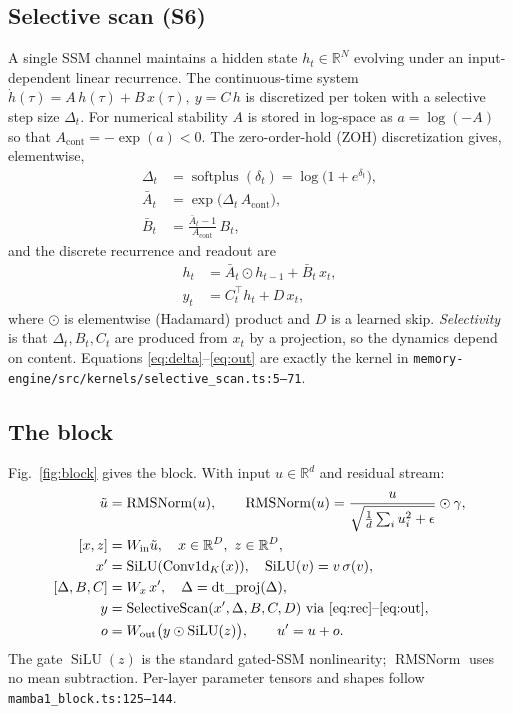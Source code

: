\documentclass[journal,onecolumn,11pt]{IEEEtran}
\DeclareMathOperator{\softplus}{softplus}
\DeclareMathOperator{\silu}{SiLU}
\DeclareMathOperator{\rmsnorm}{RMSNorm}
\newcommand{\Abar}{\bar{A}}
\newcommand{\Bbar}{\bar{B}}
\newcommand{\R}{\mathbb{R}}
\begin{document}
\subsection{Selective scan (S6)}
A single SSM channel maintains a hidden state $h_t\in\R^{N}$ evolving under an
input-dependent linear recurrence. The continuous-time system
$\dot h(\tau)=A\,h(\tau)+B\,x(\tau),\ y=C\,h$ is discretized per token with a
selective step size $\Delta_t$. For numerical stability $A$ is stored in
log-space as $a=\log(-A)$ so that $A_{\text{cont}}=-\exp(a)<0$. The zero-order-hold
(ZOH) discretization gives, elementwise,
\begin{align}
\Delta_t &= \softplus(\delta_t)=\log\!\big(1+e^{\delta_t}\big),\label{eq:delta}\\
\Abar_t &= \exp\!\big(\Delta_t\,A_{\text{cont}}\big),\label{eq:Abar}\\
\Bbar_t &= \frac{\Abar_t-1}{A_{\text{cont}}}\,B_t,\label{eq:Bbar}
\end{align}
and the discrete recurrence and readout are
\begin{align}
h_t &= \Abar_t\odot h_{t-1} + \Bbar_t\,x_t,\label{eq:rec}\\
y_t &= C_t^{\top} h_t + D\,x_t,\label{eq:out}
\end{align}
where $\odot$ is elementwise (Hadamard) product and $D$ is a learned skip.
\emph{Selectivity} is that $\Delta_t,B_t,C_t$ are produced from $x_t$ by a
projection, so the dynamics depend on content. Equations
\eqref{eq:delta}--\eqref{eq:out} are exactly the kernel in
\texttt{memory-engine/src/kernels/selective\_scan.ts:5--71}.

\subsection{The block}
Fig.~\ref{fig:block} gives the block. With input $u\in\R^{d}$ and residual
stream:
\begin{align}
\tilde u &= \rmsnorm(u),\qquad \rmsnorm(u)=\frac{u}{\sqrt{\tfrac1d\sum_i u_i^2+\epsilon}}\odot\gamma,\\
[x,z] &= W_{\text{in}}\tilde u,\quad x\in\R^{D},\ z\in\R^{D},\\
x' &= \silu(\mathrm{Conv1d}_K(x)),\quad \silu(v)=v\,\sigma(v),\\
[\Delta,B,C] &= W_{x}\,x',\quad \Delta=\mathrm{dt\_proj}(\Delta),\\
y &= \mathrm{SelectiveScan}(x',\Delta,B,C,D)\ \text{via \eqref{eq:rec}--\eqref{eq:out}},\\
o &= W_{\text{out}}\big(y\odot \silu(z)\big),\qquad u' = u + o.
\end{align}
The gate $\silu(z)$ is the standard gated-SSM nonlinearity; $\rmsnorm$ uses no
mean subtraction. Per-layer parameter tensors and shapes follow
\texttt{mamba1\_block.ts:125--144}.
\end{document}
